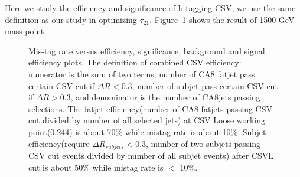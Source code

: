 \documentclass[12pt]{article} %
\begin{document}
Here we study the efficiency and significance of b-tagging CSV, we use the same definition as our study in optimizing $\tau_{21}$. Figure~\ref{fig:btag_M1500} shows the result of 1500 GeV mass point.



\begin{figure}[H] %
  \caption{Mis-tag rate versus efficiency, significance, background and signal efficiency plots. The definition of combined CSV efficiency: numerator is the sum of two terms, number of CA8 fatjet pass certain CSV cut if $\Delta R<0.3$, number of subjet pass certain CSV cut if $\Delta R>0.3$, and denominator is the number of CA8jets passing selections. The fatjet efficiency(number of CA8 fatjets passing CSV cut divided by number of all selected jets) at CSV Loose working point(0.244) is about 70\% while mistag rate is about 10\%. Subjet efficiency(require $\Delta R_{subjets} <0.3$, number of two subjets passing CSV cut events divided by number of all subjet events) after CSVL cut is about 50\% while mistag rate is $<$ 10\%.}
  \label{fig:btag_M1500}
\end{figure}





\newpage

\end{document}
